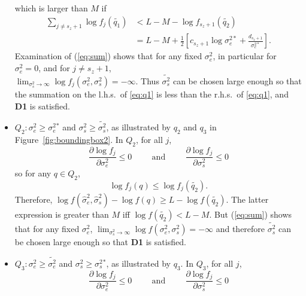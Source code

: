 \documentclass{report}
\newcommand{\RL}{f}
\newcommand{\logRL}{\log\RL}
\newcommand{\sigssq}{\sigma_s^2}
\newcommand{\sigesq}{\sigma_e^2}
\newcommand{\sshat}{\hat\sigma^2_e,\hat\sigma^2_s}
\newcommand{\logRLss}{\logRL(\sigesq,\sigssq)}
\begin{document}
\begin{itemize}
\begin{equation}
  \end{equation}
  which is larger than $M$ if
  \begin{equation}
    \label{eq:q1}
    \begin{split}
      \sum_{j \ne s_z+1} \logRL_j(\widetilde{q_1})
        &< L - M - \logRL_{s_z+1}(\widetilde{q_2})\\
        &= L - M + \frac{1}{2} \left[ c_{s_z+1}\log\sigma_e^{2*} + \frac{d_{s_z+1}}{\sigma_e^{2*}}\right].
    \end{split}
  \end{equation}
  Examination of (\ref{eq:sum}) shows that for any fixed $\sigesq$, in particular for $\sigesq=0$,
  and for $j \ne s_z+1$,\\ $\lim_{\sigssq \rightarrow \infty} \logRL_j(\sigesq,\sigssq) = -\infty$.
  Thus $\widetilde{\sigma_s^2}$ can be chosen large enough so that the summation on the
  l.h.s.~of \eqref{eq:q1} is less than the r.h.s.~of \eqref{eq:q1}, and  \textbf{D1} is satisfied.
\item $Q_2: \sigesq \ge \sigesq{}^*$ and $\sigssq \ge \widetilde{\sigssq}$, as illustrated by $q_2$ and $q_3$
  in Figure~\ref{fig:boundingbox2}.  In $Q_2$, for all $j$,
  \begin{equation*}
    \frac{\partial\logRL_j}{\partial\sigesq} \le 0 \hspace{1cm} \text{and} \hspace{1cm}
    \frac{\partial\logRL_j}{\partial\sigssq} \le 0
  \end{equation*}
  so for any $q \in Q_2$,
  \begin{equation*}
    \logRL_j(q) \le \logRL_j(\widetilde{q_2}).
  \end{equation*}
  Therefore, $\logRL(\sshat) - \logRL(q) \ge L - \logRL(\widetilde{q_2})$.  The latter expression is greater than
  $M$ iff $\logRL(\widetilde{q_2}) < L-M$.  But (\ref{eq:sum}) shows that for any fixed
  $\sigesq$, $\lim_{\sigssq \rightarrow \infty} \logRLss = -\infty$ and therefore $\widetilde{\sigma_s^2}$
  can be chosen large enough so that \textbf{D1} is satisfied.
\item $Q_3: \sigesq \ge \widetilde{\sigesq}$ and $\sigssq \ge \sigssq{}^*$, as illustrated by $q_3$.  In $Q_3$,
  for all $j$,
  \begin{equation*}
    \frac{\partial\logRL_j}{\partial\sigesq} \le 0 \hspace{1cm} \text{and} \hspace{1cm}
    \frac{\partial\logRL_j}{\partial\sigssq} \le 0
  \end{equation*}

\end{itemize}
\end{document}
